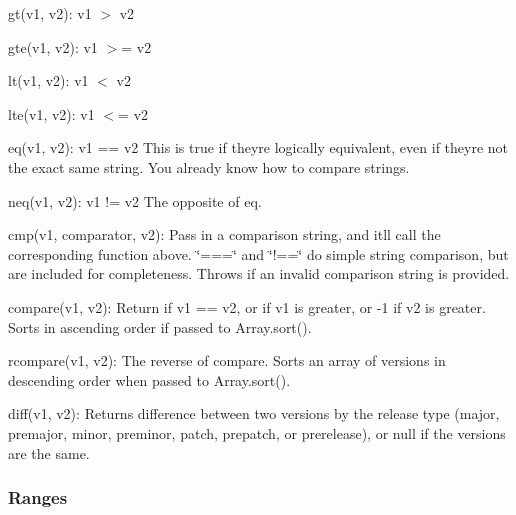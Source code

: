 \begin{DoxyItemize}
\item {\ttfamily gt(v1, v2)}\+: {\ttfamily v1 $>$ v2}
\item {\ttfamily gte(v1, v2)}\+: {\ttfamily v1 $>$= v2}
\item {\ttfamily lt(v1, v2)}\+: {\ttfamily v1 $<$ v2}
\item {\ttfamily lte(v1, v2)}\+: {\ttfamily v1 $<$= v2}
\item {\ttfamily eq(v1, v2)}\+: {\ttfamily v1 == v2} This is true if they\textquotesingle{}re logically equivalent, even if they\textquotesingle{}re not the exact same string. You already know how to compare strings.
\item {\ttfamily neq(v1, v2)}\+: {\ttfamily v1 != v2} The opposite of {\ttfamily eq}.
\item {\ttfamily cmp(v1, comparator, v2)}\+: Pass in a comparison string, and it\textquotesingle{}ll call the corresponding function above. {\ttfamily \char`\"{}===\char`\"{}} and {\ttfamily \char`\"{}!==\char`\"{}} do simple string comparison, but are included for completeness. Throws if an invalid comparison string is provided.
\item {\ttfamily compare(v1, v2)}\+: Return {} if {\ttfamily v1 == v2}, or {} if {\ttfamily v1} is greater, or {\ttfamily -\/1} if {\ttfamily v2} is greater. Sorts in ascending order if passed to {\ttfamily Array.\+sort()}.
\item {\ttfamily rcompare(v1, v2)}\+: The reverse of compare. Sorts an array of versions in descending order when passed to {\ttfamily Array.\+sort()}.
\item {\ttfamily diff(v1, v2)}\+: Returns difference between two versions by the release type ({\ttfamily major}, {\ttfamily premajor}, {\ttfamily minor}, {\ttfamily preminor}, {\ttfamily patch}, {\ttfamily prepatch}, or {\ttfamily prerelease}), or null if the versions are the same.
\end{DoxyItemize}

\subsubsection*{Ranges}


